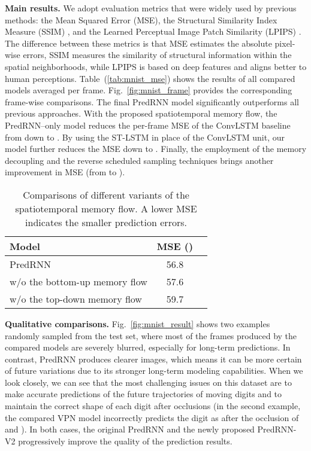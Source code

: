 \documentclass[10pt,journal,compsoc]{IEEEtran}
\let\MYoriglatexcaption\caption
\renewcommand{\caption}[2][\relax]{\MYoriglatexcaption[#2]{#2}}
\newcommand{\tab}[1]{Table~(\ref{#1})}
\newcommand{\fig}[1]{Fig.~\ref{#1}}
\newcommand{\myparagraph}[1]{\vspace{5pt} \noindent \textbf{#1.}}
\begin{document}
\myparagraph{Main results} 
We adopt evaluation metrics that were widely used by previous methods: the Mean Squared Error (MSE), the Structural Similarity Index Measure (SSIM) \cite{Wang2004Image}, and the Learned Perceptual Image Patch Similarity (LPIPS) \cite{zhang2018unreasonable}.
The difference between these metrics is that MSE estimates the absolute pixel-wise errors, SSIM measures the similarity of structural information within the spatial neighborhoods, while LPIPS is based on deep features and aligns better to human perceptions.
\tab{tab:mnist_mse} shows the results of all compared models averaged per frame. 
\fig{fig:mnist_frame} provides the corresponding frame-wise comparisons. The final PredRNN model significantly outperforms all previous approaches.
With the proposed spatiotemporal memory flow, the PredRNN--only model reduces the per-frame MSE of the ConvLSTM baseline from  down to . 
By using the ST-LSTM in place of the ConvLSTM unit, our model further reduces the MSE down to . 
Finally, the employment of the memory decoupling and the reverse scheduled sampling techniques brings another  improvement in MSE (from  to ). 


\begin{table}[b]
\caption{Comparisons of different variants of the spatiotemporal memory flow. A lower MSE indicates the smaller prediction errors.}
  \vskip -0.05in
  \label{tab:ablation_flow}
  \centering
  \begin{tabular}{lcc}
    \toprule
    Model & MSE () \\
    \midrule
    PredRNN & 56.8 \\
    w/o the bottom-up memory flow   & 57.6 \\
    w/o the top-down memory flow 
    & 59.7 \\
    \bottomrule
  \end{tabular}
\end{table}

\myparagraph{Qualitative comparisons} 
\fig{fig:mnist_result} shows two examples randomly sampled from the test set, where most of the frames produced by the compared models are severely blurred, especially for long-term predictions. 
In contrast, PredRNN produces clearer images, which means it can be more certain of future variations due to its stronger long-term modeling capabilities.
When we look closely, we can see that the most challenging issues on this dataset are to make accurate predictions of the future trajectories of moving digits and to maintain the correct shape of each digit after occlusions (in the second example, the compared VPN model incorrectly predicts the digit  as  after the occlusion of  and ).
In both cases, the original PredRNN and the newly proposed PredRNN-V2 progressively improve the quality of the prediction results.
\end{document}
